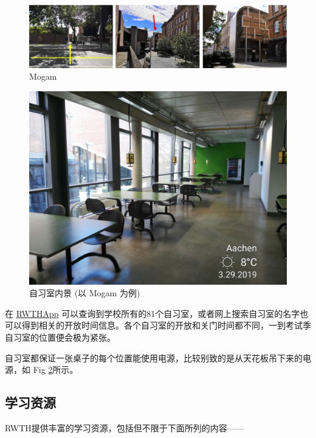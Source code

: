     \begin{figure}[ht]
      \centering
      \includegraphics[width=\textwidth]{在亚琛学习和生活/Study/Mogam.png}
      \caption{Mogam}
      \label{fig:Mogam}
    \end{figure}

    \begin{figure}[ht]
      \centering
      \includegraphics[width=.35\textwidth]{在亚琛学习和生活/Study/自习室内景 (以 Mogam 为例).jpg}
      \caption{自习室内景 (以 Mogam 为例)}
      \label{fig:自习室内景 (以 Mogam 为例)}
    \end{figure}

    在 \href{https://play.google.com/store/apps/details?id=de.rwth_aachen.rz.rwthapp&hl=en}{RWTHApp} 可以查询到学校所有的81个自习室，或者网上搜索自习室的名字也可以得到相关的开放时间信息。各个自习室的开放和关门时间都不同，一到考试季自习室的位置便会极为紧张。

    自习室都保证一张桌子的每个位置能使用电源，比较别致的是从天花板吊下来的电源，如 Fig \ref{fig:自习室内景 (以 Mogam 为例)}所示。

  \subsection{学习资源}\label{subsec:学习资源}

    RWTH提供丰富的学习资源，包括但不限于下面所列的内容——

